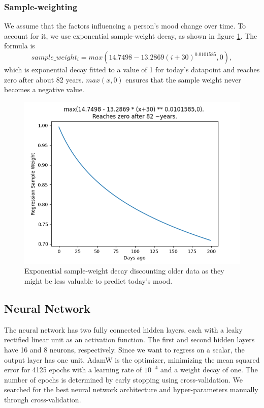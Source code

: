 \documentclass[conference]{IEEEtran}
\begin{document}
\subsubsection{Sample-weighting}
We assume that the factors influencing a person's mood change over time. To account for it, we use exponential sample-weight decay, as shown in figure \ref{fig:sample-weight}. 
The formula is 
\begin{equation}
sample\_weight_i = max(14.7498-13.2869(i + 30)^{0.0101585},0),
\end{equation}
which is exponential decay fitted to a value of 1 for today's datapoint and reaches zero after about 82 years. $max(x,0)$ ensures that the sample weight never becomes a negative value. 
\begin{figure}[htbp]
\begin{center}
\includegraphics[width=1\linewidth]{figs/RegressionSampleWeight.png}
\caption[Sample weight]{Exponential sample-weight decay discounting older data as they might be less valuable to predict today's mood.}
\label{fig:sample-weight}
\end{center}
\end{figure}


\subsection{Neural Network}
The neural network has two fully connected hidden layers, each with a leaky rectified linear unit\cite{xu_empirical_2015} as an activation function. The first and second hidden layers have 16 and 8 neurons, respectively. Since we want to regress on a scalar, the output layer has one unit. AdamW\cite{loshchilov_decoupled_2019} is the optimizer, minimizing the mean squared error for 4125 epochs with a learning rate of $10^{-4}$ and a weight decay of one. The number of epochs is determined by early stopping using cross-validation\cite{prechelt_automatic_1998}.
We searched for the best neural network architecture and hyper-parameters manually through cross-validation.
\end{document}
